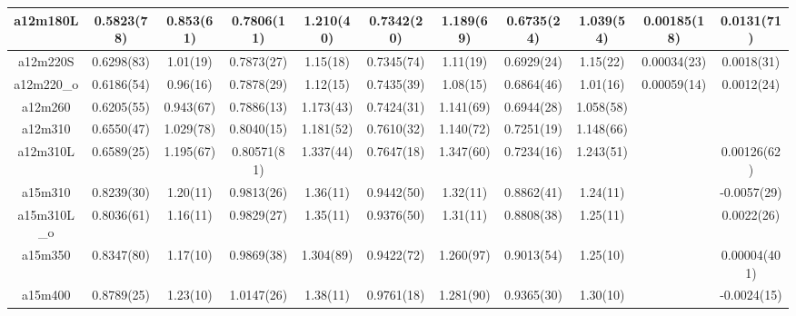 \documentclass{article}
\begin{document}
\begin{table}[h!]
\begin{tabular}{|| c |c | c | c | c | c | c | c | c | c | c ||}
 \hline
 a12m180L 
  & {0.5823(78)}   &   {0.853(61)} & {0.7806(11)}   & {1.210(40)}   & {0.7342(20)}  & {1.189(69)}   & {0.6735(24)}  & {1.039(54)}  & {0.00185(18)}  & {0.0131(71)} \\
 \hline
 a12m220S 
  & {0.6298(83)}   &   {1.01(19)} & {0.7873(27)}   & {1.15(18)}   & {0.7345(74)}  & {1.11(19)}   & {0.6929(24)}  & {1.15(22)}  & {0.00034(23)}  & {0.0018(31)} \\
 \hline
 a12m220_o 
  & {0.6186(54)}   &   {0.96(16)} & {0.7878(29)}   & {1.12(15)}   & {0.7435(39)}  & {1.08(15)}   & {0.6864(46)}  & {1.01(16)}  & {0.00059(14)}  & {0.0012(24)} \\
 \hline
 a12m260 
  & {0.6205(55)}   &   {0.943(67)} & {0.7886(13)}   & {1.173(43)}   & {0.7424(31)}  & {1.141(69)}   & {0.6944(28)}  & {1.058(58)}  & {}  & {} \\
 \hline
 a12m310 
  & {0.6550(47)}   &   {1.029(78)} & {0.8040(15)}   & {1.181(52)}   & {0.7610(32)}  & {1.140(72)}   & {0.7251(19)}  & {1.148(66)}  & {}  & {} \\
 \hline
 a12m310L 
  & {0.6589(25)}   &   {1.195(67)} & {0.80571(81)}   & {1.337(44)}   & {0.7647(18)}  & {1.347(60)}   & {0.7234(16)}  & {1.243(51)}  & {}  & {0.00126(62)} \\
 \hline
 a15m310 
  & {0.8239(30)}   &   {1.20(11)} & {0.9813(26)}   & {1.36(11)}   & {0.9442(50)}  & {1.32(11)}   & {0.8862(41)}  & {1.24(11)}  & {}  & {-0.0057(29)} \\
 \hline
 a15m310L_o 
  & {0.8036(61)}   &   {1.16(11)} & {0.9829(27)}   & {1.35(11)}   & {0.9376(50)}  & {1.31(11)}   & {0.8808(38)}  & {1.25(11)}  & {}  & {0.0022(26)} \\
 \hline
 a15m350 
  & {0.8347(80)}   &   {1.17(10)} & {0.9869(38)}   & {1.304(89)}   & {0.9422(72)}  & {1.260(97)}   & {0.9013(54)}  & {1.25(10)}  & {}  & {0.00004(401)}  \\
 \hline
 a15m400 
  & {0.8789(25)}   &   {1.23(10)} & {1.0147(26)}   & {1.38(11)}   & {0.9761(18)}  & {1.281(90)}   & {0.9365(30)}  & {1.30(10)}  & {}  & {-0.0024(15)}  \\
 \hline
 
 \end{tabular}
\end{table}
\end{document}
